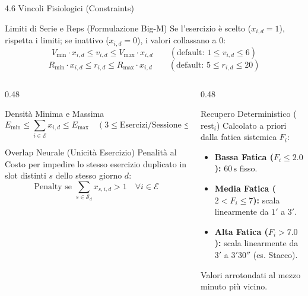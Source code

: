 \documentclass[aspectratio=169, 10pt]{beamer}
\begin{document}
\begin{frame}{4.6 Vincoli Fisiologici (Constraints)}
    \begin{block}{Limiti di Serie e Reps (Formulazione Big-M)}
        \footnotesize
        Se l'esercizio è scelto ($x_{i,d} = 1$), rispetta i limiti; se inattivo ($x_{i,d} = 0$), i valori collassano a 0:
        $$V_{\min} \cdot x_{i,d} \le v_{i,d} \le V_{\max} \cdot x_{i,d} \qquad (\text{default: } 1 \le v_{i,d} \le 6)$$
        $$R_{\min} \cdot x_{i,d} \le r_{i,d} \le R_{\max} \cdot x_{i,d} \qquad (\text{default: } 5 \le r_{i,d} \le 20)$$
    \end{block}
    \vspace{-0.2cm}
    \begin{columns}[T]
        \begin{column}{0.48\textwidth}
            \begin{exampleblock}{Densità Minima e Massima}
                \footnotesize
                $$E_{\min} \le \sum_{i \in \mathcal{E}} x_{i,d} \le E_{\max} \quad (3 \le \text{Esercizi/Sessione} \le 10)$$
            \end{exampleblock}
            \begin{alertblock}{Overlap Neurale (Unicità Esercizio)}
                \footnotesize
                Penalità al Costo per impedire lo stesso esercizio duplicato in slot distinti $s$ dello stesso giorno $d$:
                $$\text{Penalty se } \sum_{s \in \mathcal{S}_d} x_{s, i, d} > 1 \quad \forall i \in \mathcal{E}$$
            \end{alertblock}
        \end{column}
        \begin{column}{0.48\textwidth}
            \begin{block}{Recupero Deterministico ($\mathrm{rest}_i$)}
                \footnotesize
                Calcolato a priori dalla fatica sistemica $F_i$:
                \begin{itemize}\setlength{\itemsep}{0pt}
                    \item \textbf{Bassa Fatica ($F_i \le 2.0$):} $60\,\text{s}$ fisso.
                    \item \textbf{Media Fatica ($2 < F_i \le 7$):} scala linearmente da $1'$ a $3'$.
                    \item \textbf{Alta Fatica ($F_i > 7.0$):} scala linearmente da $3'$ a $3'30''$ (es. Stacco).
                \end{itemize}
                Valori arrotondati al mezzo minuto più vicino.
            \end{block}
        \end{column}
    \end{columns}
\end{frame}
\end{document}
